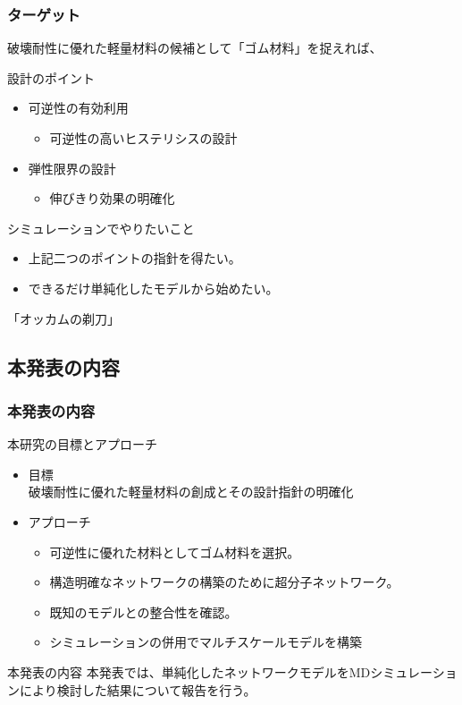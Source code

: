 \documentclass[11pt, dvipdfmx]{beamer}
\begin{document}
\begin{frame}
\frametitle{ターゲット}

破壊耐性に優れた軽量材料の候補として「ゴム材料」を捉えれば、


\begin{block}{設計のポイント}
\begin{itemize}
\item
可逆性の有効利用
	\begin{itemize}
	\item
	可逆性の高いヒステリシスの設計
	\end{itemize}
\item
弾性限界の設計
	\begin{itemize}
	\item
	伸びきり効果の明確化
	\end{itemize}
\end{itemize}
\end{block}

\begin{alertblock}{シミュレーションでやりたいこと}
\begin{itemize}
\item
上記二つのポイントの指針を得たい。
\item
できるだけ単純化したモデルから始めたい。
\end{itemize}
\centering
\Large
\color{red}「オッカムの剃刀」
\end{alertblock}

\end{frame}


\subsection{本発表の内容}
\begin{frame}
\frametitle{本発表の内容}

\begin{exampleblock}{本研究の目標とアプローチ}
\begin{itemize}
\item
目標\\
破壊耐性に優れた軽量材料の創成とその設計指針の明確化
\item
アプローチ
	\begin{itemize}
	\item
	可逆性に優れた材料としてゴム材料を選択。
	\item
	構造明確なネットワークの構築のために超分子ネットワーク。
	\item
	既知のモデルとの整合性を確認。
	\item
	\color{red}シミュレーションの併用でマルチスケールモデルを構築\color{black}
	\end{itemize}
\end{itemize}
\end{exampleblock}


\begin{block}{本発表の内容}
本発表では、単純化したネットワークモデルをMDシミュレーションにより検討した結果について報告を行う。
\end{block}
\end{frame}
\end{document}
